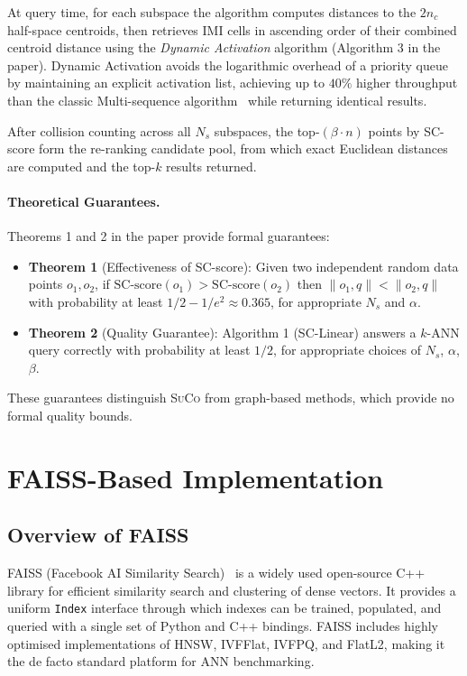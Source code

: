 \documentclass[11pt,a4paper]{article}
\newcommand{\suco}{\textsc{SuCo}}
\newcommand{\NS}{N_s}
\newcommand{\nc}{n_c}
\begin{document}
At query time, for each subspace the algorithm computes distances to the
$2\nc$ half-space centroids, then retrieves IMI cells in ascending order of
their combined centroid distance using the \textit{Dynamic Activation}
algorithm (Algorithm 3 in the paper).  Dynamic Activation avoids the
logarithmic overhead of a priority queue by maintaining an explicit activation
list, achieving up to $40\%$ higher throughput than the classic Multi-sequence
algorithm~\cite{babenko2014imi} while returning identical results.

After collision counting across all $\NS$ subspaces, the top-$(\beta \cdot n)$
points by SC-score form the re-ranking candidate pool, from which exact
Euclidean distances are computed and the top-$k$ results returned.

\paragraph{Theoretical Guarantees.}
Theorems 1 and 2 in the paper provide formal guarantees:
\begin{itemize}
  \item \textbf{Theorem 1} (Effectiveness of SC-score): Given two independent
    random data points $o_1, o_2$, if $\text{SC-score}(o_1) >
    \text{SC-score}(o_2)$ then $\|o_1, q\| < \|o_2, q\|$ with probability
    at least $1/2 - 1/e^2 \approx 0.365$, for appropriate $\NS$ and $\alpha$.
  \item \textbf{Theorem 2} (Quality Guarantee): Algorithm 1 (SC-Linear)
    answers a $k$-ANN query correctly with probability at least $1/2$, for
    appropriate choices of $\NS$, $\alpha$, $\beta$.
\end{itemize}
These guarantees distinguish \suco{} from graph-based methods, which provide
no formal quality bounds.

\section{FAISS-Based Implementation}

\subsection{Overview of FAISS}

FAISS (Facebook AI Similarity Search)~\cite{johnson2019faiss} is a widely
used open-source C++ library for efficient similarity search and clustering of
dense vectors.  It provides a uniform \texttt{Index} interface through which
indexes can be trained, populated, and queried with a single set of Python
and C++ bindings.  FAISS includes highly optimised implementations of HNSW,
IVFFlat, IVFPQ, and FlatL2, making it the de facto standard platform for
ANN benchmarking.
\end{document}
